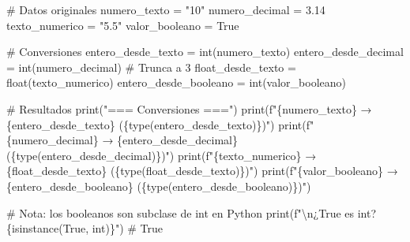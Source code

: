 \documentclass[
  doc,
  floatsintext,
  longtable,
  a4paper,
  nolmodern,
  notxfonts,
  notimes,
  12pt,
  colorlinks=true,linkcolor=blue,citecolor=blue,urlcolor=blue]{apa7}
\newenvironment{Shaded}{\begin{snugshade}}{\end{snugshade}}
\newcommand{\BuiltInTok}[1]{\textcolor[rgb]{0.00,0.23,0.31}{#1}}
\newcommand{\CharTok}[1]{\textcolor[rgb]{0.13,0.47,0.30}{#1}}
\newcommand{\CommentTok}[1]{\textcolor[rgb]{0.37,0.37,0.37}{#1}}
\newcommand{\FloatTok}[1]{\textcolor[rgb]{0.68,0.00,0.00}{#1}}
\newcommand{\NormalTok}[1]{\textcolor[rgb]{0.00,0.23,0.31}{#1}}
\newcommand{\OperatorTok}[1]{\textcolor[rgb]{0.37,0.37,0.37}{#1}}
\newcommand{\SpecialCharTok}[1]{\textcolor[rgb]{0.37,0.37,0.37}{#1}}
\newcommand{\SpecialStringTok}[1]{\textcolor[rgb]{0.13,0.47,0.30}{#1}}
\newcommand{\StringTok}[1]{\textcolor[rgb]{0.13,0.47,0.30}{#1}}
\newcommand{\VariableTok}[1]{\textcolor[rgb]{0.07,0.07,0.07}{#1}}
\begin{document}
\begin{Shaded}
\begin{Highlighting}[]
\CommentTok{\# Datos originales}
\NormalTok{numero\_texto }\OperatorTok{=} \StringTok{"10"}
\NormalTok{numero\_decimal }\OperatorTok{=} \FloatTok{3.14}
\NormalTok{texto\_numerico }\OperatorTok{=} \StringTok{"5.5"}
\NormalTok{valor\_booleano }\OperatorTok{=} \VariableTok{True}

\CommentTok{\# Conversiones}
\NormalTok{entero\_desde\_texto }\OperatorTok{=} \BuiltInTok{int}\NormalTok{(numero\_texto)}
\NormalTok{entero\_desde\_decimal }\OperatorTok{=} \BuiltInTok{int}\NormalTok{(numero\_decimal)  }\CommentTok{\# Trunca a 3}
\NormalTok{float\_desde\_texto }\OperatorTok{=} \BuiltInTok{float}\NormalTok{(texto\_numerico)}
\NormalTok{entero\_desde\_booleano }\OperatorTok{=} \BuiltInTok{int}\NormalTok{(valor\_booleano)}

\CommentTok{\# Resultados}
\BuiltInTok{print}\NormalTok{(}\StringTok{"=== Conversiones ==="}\NormalTok{)}
\BuiltInTok{print}\NormalTok{(}\SpecialStringTok{f"\textquotesingle{}}\SpecialCharTok{\{}\NormalTok{numero\_texto}\SpecialCharTok{\}}\SpecialStringTok{\textquotesingle{} → }\SpecialCharTok{\{}\NormalTok{entero\_desde\_texto}\SpecialCharTok{\}}\SpecialStringTok{ (}\SpecialCharTok{\{}\BuiltInTok{type}\NormalTok{(entero\_desde\_texto)}\SpecialCharTok{\}}\SpecialStringTok{)"}\NormalTok{)}
\BuiltInTok{print}\NormalTok{(}\SpecialStringTok{f"}\SpecialCharTok{\{}\NormalTok{numero\_decimal}\SpecialCharTok{\}}\SpecialStringTok{ → }\SpecialCharTok{\{}\NormalTok{entero\_desde\_decimal}\SpecialCharTok{\}}\SpecialStringTok{ (}\SpecialCharTok{\{}\BuiltInTok{type}\NormalTok{(entero\_desde\_decimal)}\SpecialCharTok{\}}\SpecialStringTok{)"}\NormalTok{)}
\BuiltInTok{print}\NormalTok{(}\SpecialStringTok{f"\textquotesingle{}}\SpecialCharTok{\{}\NormalTok{texto\_numerico}\SpecialCharTok{\}}\SpecialStringTok{\textquotesingle{} → }\SpecialCharTok{\{}\NormalTok{float\_desde\_texto}\SpecialCharTok{\}}\SpecialStringTok{ (}\SpecialCharTok{\{}\BuiltInTok{type}\NormalTok{(float\_desde\_texto)}\SpecialCharTok{\}}\SpecialStringTok{)"}\NormalTok{)}
\BuiltInTok{print}\NormalTok{(}\SpecialStringTok{f"}\SpecialCharTok{\{}\NormalTok{valor\_booleano}\SpecialCharTok{\}}\SpecialStringTok{ → }\SpecialCharTok{\{}\NormalTok{entero\_desde\_booleano}\SpecialCharTok{\}}\SpecialStringTok{ (}\SpecialCharTok{\{}\BuiltInTok{type}\NormalTok{(entero\_desde\_booleano)}\SpecialCharTok{\}}\SpecialStringTok{)"}\NormalTok{)}

\CommentTok{\# Nota: los booleanos son subclase de int en Python}
\BuiltInTok{print}\NormalTok{(}\SpecialStringTok{f"}\CharTok{\textbackslash{}n}\SpecialStringTok{¿True es int? }\SpecialCharTok{\{}\BuiltInTok{isinstance}\NormalTok{(}\VariableTok{True}\NormalTok{, }\BuiltInTok{int}\NormalTok{)}\SpecialCharTok{\}}\SpecialStringTok{"}\NormalTok{)  }\CommentTok{\# True}
\end{Highlighting}
\end{Shaded}
\end{document}
